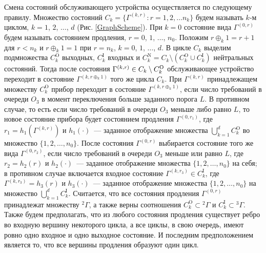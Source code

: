 \documentclass[a4paper,12pt,russian]{extarticle}
\newcommand{\G}{\Gamma}
\newcommand{\ga}[1]{\Gamma^{\left( #1 \right)} }
\begin{document}
Смена состояний обслуживающего устройства осуществляется по следующему правилу. Множество состояний $C_k = \{\G^{(k,r)} \colon r=1,2,\ldots n_k\}$ будем называть $k$-м циклом, $k=1$, $2$, $\ldots$, $d$ (Рис. \ref{GraphScheme}). При $k=0$ состояние вида $\ga{0,r}$ будем называть состоянием продления, $r=0$, $1$, $\ldots$, $n_0$. Положим $r \oplus_k 1 = r+1$ для $r<n_k$ и $r \oplus_k 1 = 1$ при $r=n_k$, $k = 0$, $1$, $\ldots$, $d$. В цикле $C_k$ выделим подмножества $C_k^{\mathrm{O}}$ выходных, $C_k^{\mathrm{I}}$ входных и $C_k^{\mathrm{N}} = C_k \setminus (C_k^{\mathrm{O}} \cup C_k^{\mathrm{I}})$ нейтральных состояний. Тогда после состояния $\ga{k,r} \hm\in C_k\setminus C_k^{\mathrm{O}}$ обслуживающее устройство переходит в состояние $\ga{k,r \oplus_k 1}$ того же цикла $C_k$. При $\ga{k,r}$ принадлежащем множеству $C_k^{\mathrm{O}}$ прибор переходит в состояние $\ga{k,r\oplus_k 1}$, если число требований в очереди $O_3$ в момент переключения больше заданного порога $L$. В противном случае, то есть если число требований в очереди $O_3$ меньше либо равно $L$, то новое состояние прибора будет состоянием продления $\ga{0,r_1}$, где $r_1=h_1(\ga{k,r})$ и $h_1(\cdot)$~--- заданное отображение множества $\bigcup\limits_{k=1}^d C_k^{\mathrm{O}}$ во множество $\{1,2,\ldots, n_0\}$. После состояния $\ga{0,r}$ выбирается состояние того же вида $\ga{0,r_2}$, если число требований в очереди $O_3$ меньше или равно $L$, где $r_2=h_2(r)$ и $h_2(\cdot)$~--- заданное отображение множества $\{1,2, \ldots, n_0\}$ на себя; в противном случае включается входное состояние $\ga{k,r_3} \in C_k^{\mathrm{I}}$, где $\ga{k,r_3}=h_3(r)$ и $h_3(\cdot)$~--- заданное отображение множества $\{1,2, \ldots, n_0\}$ на множество  $\bigcup\limits_{k=1}^d C_k^{\mathrm{I}}$. Считается, что все состояния продления $\ga{0,r}$ принадлежат множеству ${}^2 \G$, а также верны соотношения $C_k^\mathrm{O}\subset {}^2 \G$ и $C_k^\mathrm{I}\subset {}^3 \G$. Также будем предполагать, что из любого состояния продления существует ребро во входную вершину некоторого цикла, а все циклы, в свою очередь, имеют ровно одно входное и одно выходное состояние. И последним предположением является то, что все вершины продления образуют один цикл.
\end{document}
